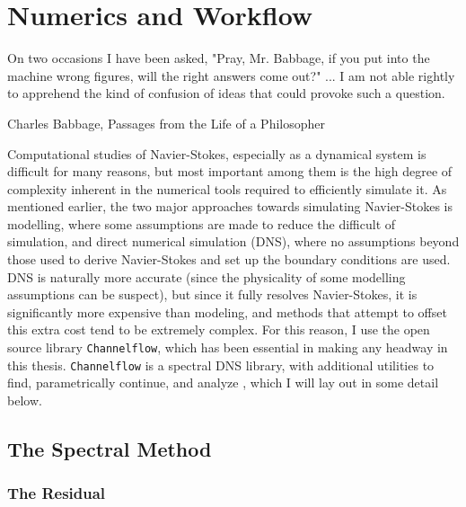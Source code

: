 \chapter{Numerics and Workflow}

    	 	\epigraph{On two occasions I have been asked, "Pray, Mr. Babbage, if you put into the machine wrong figures, will the right answers come out?" ... I am not able rightly to apprehend the kind of confusion of ideas that could provoke such a question.}{Charles Babbage, Passages from the Life of a Philosopher}

Computational studies of Navier-Stokes, especially as a dynamical system is difficult for many reasons, but most important among them is the high degree of complexity inherent in the numerical tools required to efficiently simulate it. As mentioned earlier, the two major approaches towards simulating Navier-Stokes  is modelling, where some assumptions are made to reduce the difficult of simulation, and direct numerical simulation (DNS), where no assumptions beyond those used to derive Navier-Stokes and set up the boundary conditions are used. DNS is naturally more accurate (since the physicality of some modelling assumptions can be suspect), but since it fully resolves Navier-Stokes, it is significantly more expensive than modeling, and methods that attempt to offset this extra cost tend to be extremely complex. For this reason, I use the open source library {\tt Channelflow}, which has been essential in making any headway in this thesis. {\tt Channelflow} is a spectral DNS library, with additional utilities to find, parametrically continue, and analyze \ecs, which I will lay out in some detail below.
\section{The Spectral Method}
\subsection{The Residual}

